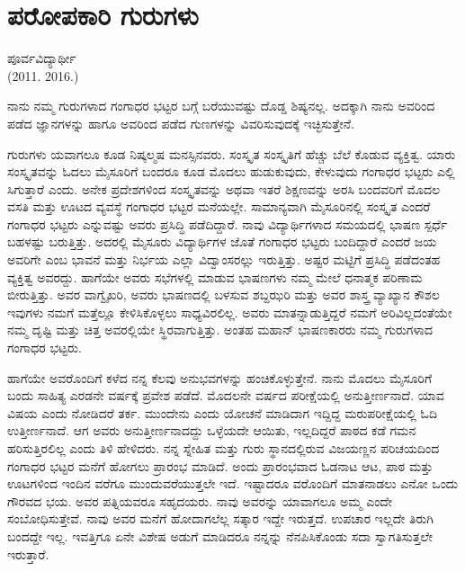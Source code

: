 {\fontsize{14}{16}\selectfont
\chapter{ಪರೋಪಕಾರಿ ಗುರುಗಳು}

\begin{center}
\smallskip
ಪೂರ್ವವಿದ್ಯಾರ್ಥೀ\\
(2011.   \enginline{-}   2016.)
\addrule
\end{center}
ನಾನು ನಮ್ಮ ಗುರುಗಳಾದ ಗಂಗಾಧರ ಭಟ್ಟರ ಬಗ್ಗೆ ಬರೆಯುವಷ್ಟು ದೊಡ್ಡ ಶಿಷ್ಯನಲ್ಲ. ಅದಕ್ಕಾಗಿ ನಾನು ಅವರಿಂದ ಪಡೆದ ಜ್ಞಾನಗಳನ್ನು ಹಾಗೂ ಅವರಿಂದ ಪಡೆದ ಗುಣಗಳನ್ನು ವಿವರಿಸುವುದಕ್ಕೆ ಇಚ್ಛಿಸುತ್ತೇನೆ.

ಗುರುಗಳು ಯವಾಗಲೂ ಕೂಡ ನಿಷ್ಕಲ್ಮಷ ಮನಸ್ಸಿನವರು. ಸಂಸ್ಕೃತ ಸಂಸ್ಕೃತಿಗೆ ಹೆಚ್ಚು ಬೆಲೆ ಕೊಡುವ ವ್ಯಕ್ತಿತ್ವ. ಯಾರು ಸಂಸ್ಕೃತವನ್ನು ಓದಲು ಮೈಸೂರಿಗೆ ಬಂದರೂ ಕೂಡ ಮೊದಲು ಹುಡುಕುವುದು, ಕೇಳುವುದು ಗಂಗಾಧರ ಭಟ್ಟರು ಎಲ್ಲಿ ಸಿಗುತ್ತಾರೆ ಎಂದು. ಅನೇಕ ಪ್ರದೇಶಗಳಿಂದ ಸಂಸ್ಕೃತವನ್ನು ಅಥವಾ ಇತರೆ ಶಿಕ್ಷಣವನ್ನು ಅರಸಿ ಬಂದವರಿಗೆ ಮೊದಲ ವಸತಿ ಮತ್ತು ಊಟದ ವ್ಯವಸ್ಥೆ ಗಂಗಾಧರ ಭಟ್ಟರ ಮನೆಯಲ್ಲೇ. ಸಾಮಾನ್ಯವಾಗಿ ಮೈಸೂರಿನಲ್ಲಿ ಸಂಸ್ಕೃತ ಎಂದರೆ ಗಂಗಾಧರ ಭಟ್ಟರು ಎನ್ನುವಷ್ಟು ಅವರು ಪ್ರಸಿದ್ಧಿ ಪಡೆದಿದ್ದಾರೆ. ನಾವು ವಿದ್ಯಾರ್ಥಿಗಳಾದ ಸಮಯದಲ್ಲಿ ಭಾಷಣ ಸ್ಪರ್ಧೆ ಬಹಳಷ್ಟು ಬರುತ್ತಿತ್ತು. ಅದರಲ್ಲಿ ಮೈಸೂರು ವಿದ್ಯಾರ್ಥಿಗಳ ಜೊತೆ ಗಂಗಾಧರ ಭಟ್ಟರು ಬಂದಿದ್ದಾರೆ ಎಂದರೆ ಜಯ ಅವರಿಗೇ ಎಂಬ ಭಾವನೆ ಮತ್ತು ನಿರ್ಭಯ ಎಲ್ಲಾ ವಿದ್ವಾಂಸರಲ್ಲು ಇರುತ್ತಿತ್ತು. ಅಷ್ಟರ ಮಟ್ಟಿಗೆ ಪ್ರಸಿದ್ಧಿ ಪಡೆದಂತಹ ವ್ಯಕ್ತಿತ್ವ ಅವರದ್ದು. ಹಾಗೆಯೇ ಅವರು ಸಭೆಗಳಲ್ಲಿ ಮಾಡುವ ಭಾಷಣಗಳು ನಮ್ಮ ಮೇಲೆ ಧನಾತ್ಮಕ ಪರಿಣಾಮ ಬೀರುತ್ತಿತ್ತು. ಅವರ ವಾಗ್ವೈಖರಿ, ಅವರು ಭಾಷಣದಲ್ಲಿ ಬಳಸುವ ಶಬ್ದಝರಿ ಮತ್ತು ಅವರ ಶಾಸ್ತ್ರ ವ್ಯಾಖ್ಯಾನ ಕೌಶಲ  \enginline{-}   ಇವುಗಳು ನಮಗೆ ಮತ್ತೆಲ್ಲೂ ಕೇಳಿಸಿಕೊಳ್ಳಲು ಸಾಧ್ಯವಿರಲಿಲ್ಲ. ಅವರು ಮಾತನ್ನಾಡುತ್ತಿದ್ದರೆ ನಮಗೆ ಅರಿವಿಲ್ಲದಂತೆಯೇ ನಮ್ಮ ದೃಷ್ಟಿ ಮತ್ತು ಚಿತ್ತ ಅವರಲ್ಲಿಯೇ ಸ್ಥಿರವಾಗುತ್ತಿತ್ತು. ಅಂತಹ ಮಹಾನ್ ಭಾಷಣಕಾರರು ನಮ್ಮ ಗುರುಗಳಾದ ಗಂಗಾಧರ ಭಟ್ಟರು.
	
ಹಾಗೆಯೇ ಅವರೊಂದಿಗೆ ಕಳೆದ ನನ್ನ ಕೆಲವು ಅನುಭವಗಳನ್ನು ಹಂಚಿಕೊಳ್ಳುತ್ತೇನೆ. ನಾನು ಮೊದಲು ಮೈಸೂರಿಗೆ ಬಂದು ಸಾಹಿತ್ಯ ಎರಡನೇ ವರ್ಷಕ್ಕೆ ಪ್ರವೇಶ ಪಡೆದೆ. ಮೊದಲನೇ ವರ್ಷದ ಪರೀಕ್ಷೆಯಲ್ಲಿ ಅನುತ್ತೀರ್ಣನಾದೆ. ಯಾವ ವಿಷಯ ಎಂದು ನೋಡಿದರೆ ತರ್ಕ. ಮುಂದೇನು ಎಂದು ಯೋಚನೆ ಮಾಡಿದಾಗ ಇದ್ದಿದ್ದ ಮರುಪರೀಕ್ಷೆಯಲ್ಲಿ ಓದಿ ಉತ್ತೀರ್ಣನಾದೆ. ಆಗ ಅವರು ಅನುತ್ತೀರ್ಣನಾದದ್ದು ಒಳ್ಳೆಯದೇ ಆಯಿತು, ಇಲ್ಲದಿದ್ದರೆ ಪಾಠದ ಕಡೆ ಗಮನ ಹರಿಸುತ್ತಿರಲಿಲ್ಲ ಎಂದು ತಿಳಿ ಹೇಳಿದರು. ನನ್ನ ಸ್ನೇಹಿತ ಮತ್ತು ಗುರು ಸ್ಥಾನದಲ್ಲಿರುವ ವಿಜಯಣ್ಣನ ಪರಿಚಯದಿಂದ ಗಂಗಾಧರ ಭಟ್ಟರ ಮನೆಗೆ ಹೋಗಲು ಪ್ರಾರಂಭ ಮಾಡಿದೆ. ಅಂದು ಪ್ರಾರಂಭವಾದ ಓಡನಾಟ ಆಟ, ಪಾಠ ಮತ್ತು ಊಟಗಳಿಂದ ಇಂದಿನ ವರೆಗೂ ಮುಂದುವರೆಯುತ್ತಲೇ ಇದೆ. ಇಷ್ಟಾದರೂ ವರೊಂದಿಗೆ ಮಾತನಾಡಲು ಎನೋ ಒಂದು ಗೌರವದ ಭಯ. ಅವರ ಪತ್ನಿಯವರೂ ಸಹೃದಯರು. ನಾವು ಅವರನ್ನು ಯಾವಾಗಲೂ ಅಮ್ಮ ಎಂದೇ ಸಂಬೋಧಿಸುತ್ತೇವೆ. ನಾವು ಅವರ ಮನೆಗೆ ಹೋದಾಗಲೆಲ್ಲ ಸತ್ಕಾರ ಇದ್ದೇ ಇರುತ್ತದೆ. ಉಪಚಾರ ಇಲ್ಲದೇ ತಿರುಗಿ ಬಂದದ್ದೇ ಇಲ್ಲ. ಇವತ್ತಿಗೂ ಏನೇ ವಿಶೇಷ ಅಡುಗೆ ಮಾಡಿದರೂ ನನ್ನನ್ನು ನೆನಪಿಸಿಕೊಂಡು ಸದಾ ಸ್ವಾಗತಿಸುತ್ತಲೇ ಇರುತ್ತಾರೆ.
	
}
